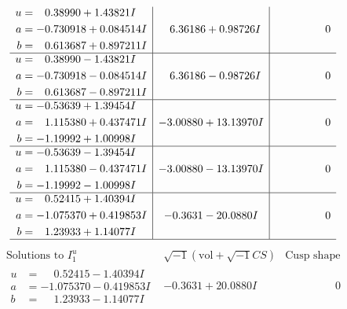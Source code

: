 \documentclass[1p]{elsarticle_modified}
\theoremstyle{definition}
\newcommand{\I}{\sqrt{-1}}
\begin{document}
$$\begin{array}{c|c|c}
\begin{aligned}
u &= \phantom{-}0.38990 + 1.43821 I \\
a &= -0.730918 + 0.084514 I \\
b &= \phantom{-}0.613687 + 0.897211 I\end{aligned}
 & \phantom{-}6.36186 + 0.98726 I & \phantom{-0.000000 } 0 \\ \hline\begin{aligned}
u &= \phantom{-}0.38990 - 1.43821 I \\
a &= -0.730918 - 0.084514 I \\
b &= \phantom{-}0.613687 - 0.897211 I\end{aligned}
 & \phantom{-}6.36186 - 0.98726 I & \phantom{-0.000000 } 0 \\ \hline\begin{aligned}
u &= -0.53639 + 1.39454 I \\
a &= \phantom{-}1.115380 + 0.437471 I \\
b &= -1.19992 + 1.00998 I\end{aligned}
 & -3.00880 + 13.13970 I & \phantom{-0.000000 } 0 \\ \hline\begin{aligned}
u &= -0.53639 - 1.39454 I \\
a &= \phantom{-}1.115380 - 0.437471 I \\
b &= -1.19992 - 1.00998 I\end{aligned}
 & -3.00880 - 13.13970 I & \phantom{-0.000000 } 0 \\ \hline\begin{aligned}
u &= \phantom{-}0.52415 + 1.40394 I \\
a &= -1.075370 + 0.419853 I \\
b &= \phantom{-}1.23933 + 1.14077 I\end{aligned}
 & -0.3631 - 20.0880 I & \phantom{-0.000000 } 0\\
 \hline 
 \end{array}$$\newpage$$\begin{array}{c|c|c}  
\text{Solutions to }I^u_{1}& \I (\text{vol} + \sqrt{-1}CS) & \text{Cusp shape}\\
 \hline 
\begin{aligned}
u &= \phantom{-}0.52415 - 1.40394 I \\
a &= -1.075370 - 0.419853 I \\
b &= \phantom{-}1.23933 - 1.14077 I\end{aligned}
 & -0.3631 + 20.0880 I & \phantom{-0.000000 } 0 \\ \hline\begin{aligned}

\end{aligned}
\end{array}$$
\end{document}
